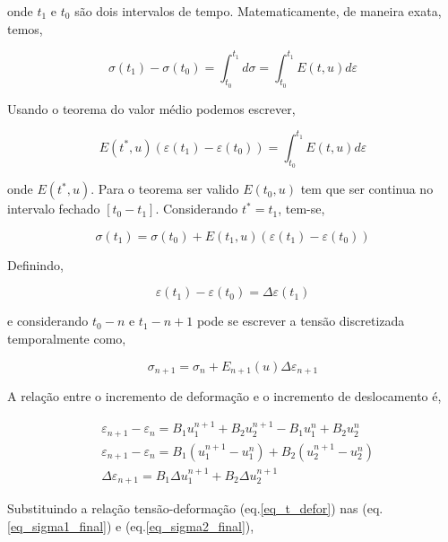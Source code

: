 \documentclass[12pt,a4paper]{article}
\newcommand{\diff}[1]{d#1}
\begin{document}
\noindent
onde $t_1$ e $t_0$ são dois intervalos de tempo. Matematicamente, de maneira exata, temos, 
 
\begin{equation}
\sigma\left(t_1\right) - \sigma\left(t_0\right) = \int_{t_0}^{t_1} \diff{\sigma} = \int_{t_0}^{t_1} E\left(t,u\right) \diff{\varepsilon}
\end{equation}

Usando o teorema do valor médio podemos escrever, 
 
\begin{equation}
E\left(t^*,u\right)\left(\varepsilon(t_1) - \varepsilon(t_0)\right)  = \int_{t_0}^{t_1} E\left(t,u\right) \diff{\varepsilon}
\end{equation}

\noindent
onde $E\left(t^*,u\right)$. Para o teorema ser valido $E(t_0, u)$ tem que ser continua no intervalo fechado $[t_0-t_1]$. Considerando  $t^*=t_1$, tem-se,

\begin{equation}
\sigma\left(t_1\right) = \sigma\left(t_0\right) + E\left(t_1,u\right) \left(\varepsilon(t_1) - \varepsilon(t_0)\right)
\end{equation}

Definindo,

\begin{equation}
\varepsilon(t_1) - \varepsilon(t_0) = \Delta\varepsilon(t_1)
\end{equation}

\noindent
e considerando $t_0 - n$ e $t_1 - n + 1$ pode se escrever a tensão discretizada temporalmente como,

\begin{equation}
\sigma_{n + 1} = \sigma_{n} + E_{n+1}\left(u\right) \Delta\varepsilon_{n+1}
\end{equation}

A relação entre o incremento de deformação e o incremento de deslocamento é,

\begin{align}
&\varepsilon_{n+1} - \varepsilon_{n} = B_1 u_1^{n+1} + B_2 u_2^{n+1} - B_1 u_1^{n} + B_2 u_2^{n}\\
&\varepsilon_{n+1} - \varepsilon_{n} = B_1(u_1^{n+1} - u_1^{n}) + B_2 ( u_2^{n+1} - u_2^{n})\\
&\Delta \varepsilon_{n+1} = B_1 \Delta u_1^{n+1} + B_2 \Delta u_2^{n+1}
\end{align}


Substituindo a relação tensão-deformação (eq.\ref{eq_t_defor}) nas  (eq.\ref{eq_sigma1_final}) e (eq.\ref{eq_sigma2_final}), 
\end{document}
